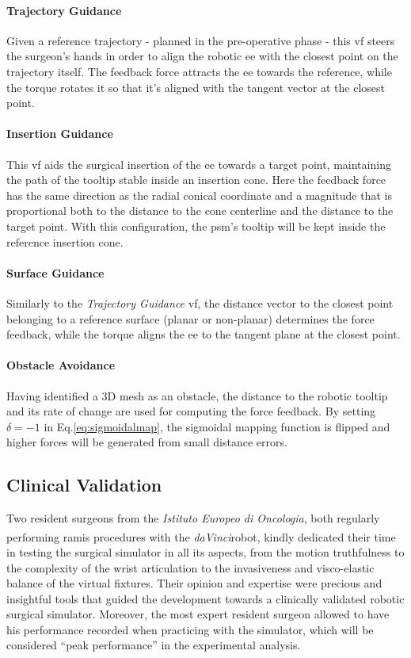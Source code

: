\documentclass{article}
\newcommand{\cright}{\textsuperscript{\textregistered}\phantom{..}}
\begin{document}
\begin{multicols}{2}
\paragraph{Trajectory Guidance} Given a reference trajectory - planned in the pre-operative phase - this \ac{vf} steers the surgeon's hands in order to align the robotic \ac{ee} with the closest point on the trajectory itself. The feedback force attracts the \ac{ee} towards the reference, while the torque rotates it so that it's aligned with the tangent vector at the closest point. 
\paragraph{Insertion Guidance} This \ac{vf} aids the surgical insertion of the \ac{ee} towards a target point, maintaining the path of the tooltip stable inside an insertion cone. Here the feedback force has the same direction as the radial conical coordinate and a magnitude that is proportional both to the distance to the cone centerline and the distance to the target point. With this configuration, the \ac{psm}'s tooltip will be kept inside the reference insertion cone.
\paragraph{Surface Guidance} Similarly to the \textit{Trajectory Guidance} \ac{vf}, the distance vector to the closest point belonging to a reference surface (planar or non-planar) determines the force feedback, while the torque aligns the \ac{ee} to the tangent plane at the closest point.
\paragraph{Obstacle Avoidance} Having identified a 3D mesh as an obstacle, the distance to the robotic tooltip and its rate of change are used for computing the force feedback. By setting $\delta = -1$ in Eq.\ref{eq:sigmoidalmap}, the sigmoidal mapping function is flipped and higher forces will be generated from small distance errors. 
\subsection{Clinical Validation}
Two resident surgeons from the \textit{Istituto Europeo di Oncologia}, both regularly performing \ac{ramis} procedures with the \textit{daVinci}\cright robot, kindly dedicated their time in testing the surgical simulator in all its aspects, from the motion truthfulness to the complexity of the wrist articulation to the invasiveness and visco-elastic balance of the virtual fixtures. Their opinion and expertise were precious and insightful tools that guided the development towards a clinically validated robotic surgical simulator. 
Moreover, the most expert resident surgeon allowed to have his performance recorded when practicing with the simulator, which will be considered ``peak performance'' in the experimental analysis. 

\end{multicols}
\end{document}
